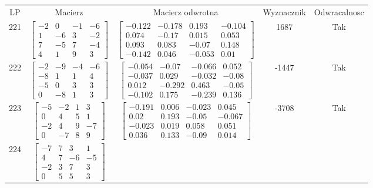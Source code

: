 \documentclass[a4paper,12pt]{article}
\begin{document}
\bgroup {} \vspace{0.2in} \begin{tabular}{c c c c c}
LP & Macierz & Macierz odwrotna & Wyznacznik & Odwracalnosc\\
221
&
$\begin{bmatrix} -2 & 0 & -1 & -6 \\ 1 & -6 & 3 & -2 \\ 7 & -5 & 7 & -4 \\ 4 & 1 & 9 & 3 \end{bmatrix}$
&
$\begin{bmatrix} -0.122 & -0.178 & 0.193 & -0.104 \\ 0.074 & -0.17 & 0.015 & 0.053 \\ 0.093 & 0.083 & -0.07 & 0.148 \\ -0.142 & 0.046 & -0.053 & 0.01 \end{bmatrix}$
&
1687
&
Tak
\\
222
&
$\begin{bmatrix} -2 & -9 & -4 & -6 \\ -8 & 1 & 1 & 4 \\ -5 & 0 & 3 & 3 \\ 0 & -8 & 1 & 3 \end{bmatrix}$
&
$\begin{bmatrix} -0.054 & -0.07 & -0.066 & 0.052 \\ -0.037 & 0.029 & -0.032 & -0.08 \\ 0.012 & -0.292 & 0.463 & -0.05 \\ -0.102 & 0.175 & -0.239 & 0.136 \end{bmatrix}$
&
-1447
&
Tak
\\
223
&
$\begin{bmatrix} -5 & -2 & 1 & 3 \\ 0 & 4 & 5 & 1 \\ -2 & 4 & 9 & -7 \\ 0 & -7 & 8 & 9 \end{bmatrix}$
&
$\begin{bmatrix} -0.191 & 0.006 & -0.023 & 0.045 \\ 0.02 & 0.193 & -0.05 & -0.067 \\ -0.023 & 0.019 & 0.058 & 0.051 \\ 0.036 & 0.133 & -0.09 & 0.014 \end{bmatrix}$
&
-3708
&
Tak
\\
224
&
$\begin{bmatrix} -7 & 7 & 3 & 1 \\ 4 & 7 & -6 & -5 \\ -2 & 3 & 7 & 3 \\ 0 & 5 & 5 & 3 \end{bmatrix}$

\end{tabular}
\end{document}
